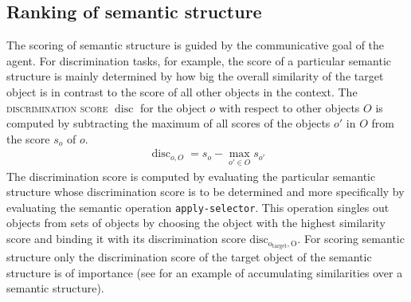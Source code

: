 \subsection{Ranking of semantic structure}
The scoring of semantic structure is guided by the communicative goal 
of the agent. For discrimination tasks, for example, the score of a particular 
semantic structure is mainly determined by how 
big the overall similarity of the target object is in contrast to 
the score of all other objects in the context. 
The \textsc{discrimination score} 
$\operatorname{disc}$ for the object $o$ with respect to other
objects $O$ is computed by subtracting the maximum
of all scores of the objects $o'$ in $O$ from the score $s_o$ of $o$.
\begin{eqnarray}
\operatorname{disc}_{o,O}=s_o - \max_{o' \in O}s_{o'}
\end{eqnarray}
The discrimination score is computed by evaluating the 
particular semantic structure whose discrimination score 
is to be determined and more specifically by evaluating the semantic operation 
{\footnotesize\tt apply-selector}. This operation singles out objects 
from sets of objects by choosing the object with the highest
similarity score and binding it with its discrimination score 
$\operatorname{disc_{o_{target},O}}$. 
For scoring semantic structure only the discrimination
score of the target object of the semantic structure is
of importance (see  for an example 
of accumulating similarities over a semantic structure).

